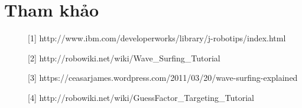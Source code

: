 \documentclass[14pt]{article}
\begin{document}
\section{Tham khảo}
\begin{description}
	\item[][1] http://www.ibm.com/developerworks/library/j-robotips/index.html
	\item[][2] http://robowiki.net/wiki/Wave\_Surfing\_Tutorial
	\item[][3] https://ceasarjames.wordpress.com/2011/03/20/wave-surfing-explained
	\item[][4] http://robowiki.net/wiki/GuessFactor\_Targeting\_Tutorial
\end{description}
\end{document}
